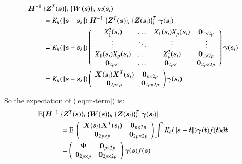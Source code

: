\documentclass[authoryear, review, 11pt]{elsarticle}
\begin{document}
    \begin{align}\label{eq:m-term}
      \bm{H}^{-1} \; &\{ \bm{Z}^T(\bm{s}) \}_i \; \{ \bm{W}(\bm{s}) \}_{ii} \; m(\bm{s}_i) \notag \\ 
      &= K_h(\| \bm{s} - \bm{s}_i \|) \; \bm{H}^{-1} \; \{ \bm{Z}^T(\bm{s}) \}_i \; \{ \bm{Z}(\bm{s}_i) \}_i^T \; \bm{\gamma}(\bm{s}_i) \notag \\
      &= K_h(\| \bm{s} - \bm{s}_i \|) \left( \begin{array}{cccc} X_1^2(\bm{s}_i) & \dots & X_1(\bm{s}_i) X_p(\bm{s}_i) & \bm{0}_{1 \times 2p} \\ \vdots & \ddots & \vdots & \vdots \\ X_1(\bm{s}_i) X_p(\bm{s}_i) & \dots & X_p^2(\bm{s}_i) & \bm{0}_{1 \times 2p} \\ \bm{0}_{2p \times 1} & \dots & \bm{0}_{2p \times 1} & \bm{0}_{2p \times 2p} \end{array} \right) \bm{\gamma}(\bm{s}_i) \notag \\
      &= K_h(\| \bm{s} - \bm{s}_i \|) \left( \begin{array}{cc} \bm{X}(\bm{s}_i) \bm{X}^T(\bm{s}_i)  & \bm{0}_{p \times 2p} \\ \bm{0}_{2p \times p} & \bm{0}_{2p \times 2p} \end{array} \right) \bm{\gamma}(\bm{s}_i)
    \end{align}

    So the expectation of (\ref{eq:m-term}) is:
    \begin{align}
      \text{E} [ \bm{H}^{-1} \; &\{ \bm{Z}^T(\bm{s}) \}_i \; \{ \bm{W}(\bm{s}) \}_{ii} \; \{ \bm{Z}(\bm{s}_i) \}_i^T \; \bm{\gamma}(\bm{s}_i) ] \notag \\
      &= \text{E} \; \left( \begin{array}{cc} \bm{X}(\bm{s}_i) \bm{X}^T(\bm{s}_i)  & \bm{0}_{p \times 2p} \\ \bm{0}_{2p \times p} & \bm{0}_{2p \times 2p} \end{array} \right) \int K_h(\| \bm{s} - \bm{t} \|) \bm{\gamma}(\bm{t}) f(\bm{t}) \partial \bm{t} \notag \\
      &= \left( \begin{array}{cc} \bm{\Psi}  & \bm{0}_{p \times 2p} \\ \bm{0}_{2p \times p} & \bm{0}_{2p \times 2p} \end{array} \right) \bm{\gamma}(\bm{s}) f(\bm{s})
    \end{align}
    
\end{document}
